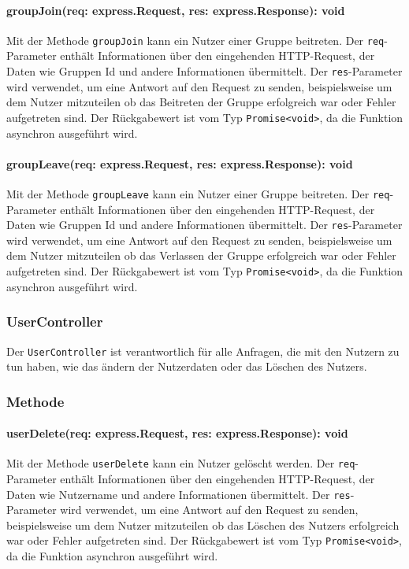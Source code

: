 \documentclass{entwurfsheft}
\begin{document}
\paragraph{groupJoin(req: express.Request, res: express.Response): void}
Mit der Methode \texttt{groupJoin} kann ein Nutzer einer Gruppe beitreten. Der \texttt{req}-Parameter enthält Informationen über den eingehenden HTTP-Request, der Daten wie Gruppen Id und andere Informationen übermittelt. Der \texttt{res}-Parameter wird verwendet, um eine Antwort auf den Request zu senden, beispielsweise um dem Nutzer mitzuteilen ob das Beitreten der Gruppe erfolgreich war oder Fehler aufgetreten sind.
Der Rückgabewert ist vom Typ \texttt{Promise<void>}, da die Funktion asynchron ausgeführt wird.
\paragraph{groupLeave(req: express.Request, res: express.Response): void}
Mit der Methode \texttt{groupLeave} kann ein Nutzer einer Gruppe beitreten. Der \texttt{req}-Parameter enthält Informationen über den eingehenden HTTP-Request, der Daten wie Gruppen Id und andere Informationen übermittelt. Der \texttt{res}-Parameter wird verwendet, um eine Antwort auf den Request zu senden, beispielsweise um dem Nutzer mitzuteilen ob das Verlassen der Gruppe erfolgreich war oder Fehler aufgetreten sind.
Der Rückgabewert ist vom Typ \texttt{Promise<void>}, da die Funktion asynchron ausgeführt wird.

\subsubsection{UserController}\label{sec:UserController}
Der \texttt{UserController} ist verantwortlich für alle Anfragen, die mit den Nutzern zu tun haben, wie das ändern der Nutzerdaten oder das Löschen des Nutzers.
\subsubsection*{Methode}
\paragraph{userDelete(req: express.Request, res: express.Response): void}
Mit der Methode \texttt{userDelete} kann ein Nutzer gelöscht werden. Der \texttt{req}-Parameter enthält Informationen über den eingehenden HTTP-Request, der Daten wie Nutzername und andere Informationen übermittelt. Der \texttt{res}-Parameter wird verwendet, um eine Antwort auf den Request zu senden, beispielsweise um dem Nutzer mitzuteilen ob das Löschen des Nutzers erfolgreich war oder Fehler aufgetreten sind.
Der Rückgabewert ist vom Typ \texttt{Promise<void>}, da die Funktion asynchron ausgeführt wird.
\end{document}
